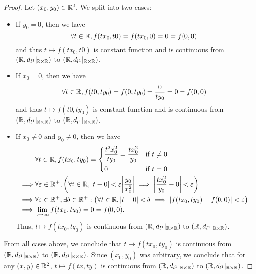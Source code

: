 \begin{proof}
  Let \((x_0, y_0) \in \mathbb{R}^2\).
  We split into two cases:
  \begin{itemize}
    \item If \(y_0 = 0\), then we have
          \[
            \forall t \in \mathbb{R}, f(t x_0, t0) = f(t x_0, 0) = 0 = f(0, 0)
          \]
          and thus \(t \mapsto f(t x_0, t0)\) is constant function and is continuous from \((\mathbb{R}, d_{l^1}|_{\mathbb{R} \times \mathbb{R}})\) to \((\mathbb{R}, d_{l^1}|_{\mathbb{R} \times \mathbb{R}})\).
    \item If \(x_0 = 0\), then we have
          \[
            \forall t \in \mathbb{R}, f(t0, t y_0) = f(0, t y_0) = \dfrac{0}{t y_0} = 0 = f(0, 0)
          \]
          and thus \(t \mapsto f(t0, t y_0)\) is constant function and is continuous from \((\mathbb{R}, d_{l^1}|_{\mathbb{R} \times \mathbb{R}})\) to \((\mathbb{R}, d_{l^1}|_{\mathbb{R} \times \mathbb{R}})\).
    \item If \(x_0 \neq 0\) and \(y_0 \neq 0\), then we have
          \begin{align*}
                     & \forall t \in \R, f(t x_0, t y_0) = \begin{dcases}
                                                             \dfrac{t^2 x_0^2}{t y_0} = \dfrac{t x_0^2}{y_0} & \text{if } t \neq 0 \\
                                                             0                                               & \text{if } t = 0
                                                           \end{dcases}                                                            \\
            \implies & \forall \varepsilon \in \R^+, \bigg(\forall t \in \R, \abs{t - 0} < \varepsilon \abs{\dfrac{y_0}{x_0^2}} \implies \abs{\dfrac{t x_0^2}{y_0} - 0} < \varepsilon\bigg) \\
            \implies & \forall \varepsilon \in \R^+, \exists \delta \in \R^+ : \big(\forall t \in \R, \abs{t - 0} < \delta \implies \abs{f(t x_0, t y_0) - f(0, 0)} < \varepsilon\big)      \\
            \implies & \lim_{t \to \infty} f(t x_0, t y_0) = 0 = f(0, 0).
          \end{align*}
          Thus, \(t \mapsto f(t x_0, t y_0)\) is continuous from \((\mathbb{R}, d_{l^1}|_{\mathbb{R} \times \mathbb{R}})\) to \((\mathbb{R}, d_{l^1}|_{\mathbb{R} \times \mathbb{R}})\).
  \end{itemize}
  From all cases above, we conclude that \(t \mapsto f(t x_0, t y_0)\) is  continuous from \((\mathbb{R}, d_{l^1}|_{\mathbb{R} \times \mathbb{R}})\) to \((\mathbb{R}, d_{l^1}|_{\mathbb{R} \times \mathbb{R}})\).
  Since \((x_0, y_0)\) was arbitrary, we conclude that for any \((x, y) \in \mathbb{R}^2\), \(t \mapsto f(tx, ty)\) is continuous from \((\mathbb{R}, d_{l^1}|_{\mathbb{R} \times \mathbb{R}})\) to \((\mathbb{R}, d_{l^1}|_{\mathbb{R} \times \mathbb{R}})\).


\end{proof}
